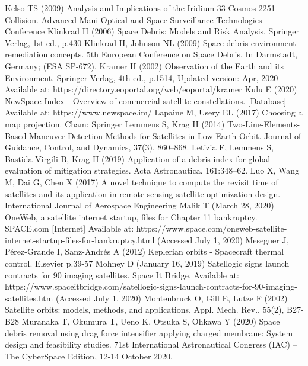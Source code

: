 \documentclass[12pt,a4paper,notitlepage,oneside,openright]{report}
\begin{document}
\begin{thebibliography}{100}
 Kelso TS (2009) Analysis and Implications of the Iridium 33-Cosmos 2251 Collision. Advanced Maui Optical and Space Surveillance Technologies Conference
 Klinkrad H (2006) Space Debris: Models and Risk Analysis. Springer Verlag, 1st ed., p.430
 Klinkrad H, Johnson NL (2009) Space debris environment remediation concepts. 5th European Conference on Space Debris. In Darmstadt, Germany; (ESA SP-672). 
 Kramer H (2002) Observation of the Earth and its Environment. Springer Verlag, 4th ed., p.1514, Updated version: Apr, 2020 Available at: https://directory.eoportal.org/web/eoportal/kramer
 Kulu E (2020) NewSpace Index - Overview of commercial satellite constellations. [Database] Available at: https://www.newspace.im/
 Lapaine M, Usery EL (2017) Choosing a map projection. Cham: Springer
 Lemmens S, Krag H (2014) Two-Line-Elements-Based Maneuver Detection Methods for Satellites in Low Earth Orbit. Journal of Guidance, Control, and Dynamics, 37(3), 860–868.
 Letizia F, Lemmens S, Bastida Virgili B, Krag H (2019) Application of a debris index for global evaluation of mitigation strategies. Acta Astronautica. 161:348–62.
 Luo X, Wang M, Dai G, Chen X (2017) A novel technique to compute the revisit time of satellites and its application in remote sensing satellite optimization design. International Journal of Aerospace Engineering
 Malik T (March 28, 2020) OneWeb, a satellite internet startup, files for Chapter 11 bankruptcy. SPACE.com [Internet] Available at: https://www.space.com/oneweb-satellite-internet-startup-files-for-bankruptcy.html (Accessed July 1, 2020)
 Meseguer J, Pérez-Grande I, Sanz-Andrés A (2012) Keplerian orbits - Spacecraft thermal control. Elsevier p.39-57
 Mohney D (January 16, 2019) Satellogic signs launch contracts for 90 imaging satellites. Space It Bridge. Available at: https://www.spaceitbridge.com/satellogic-signs-launch-contracts-for-90-imaging-satellites.htm (Accessed July 1, 2020)
 Montenbruck O, Gill E, Lutze F (2002) Satellite orbits: models, methods, and applications. Appl. Mech. Rev., 55(2), B27-B28
 Muranaka T, Okumura T, Ueno K, Otsuka S, Ohkawa Y (2020) Space debris removal using drag force intensifier applying charged membrane: System design and feasibility studies. 71st International Astronautical Congress (IAC) – The CyberSpace Edition, 12-14 October 2020. 

\end{thebibliography}
\end{document}
